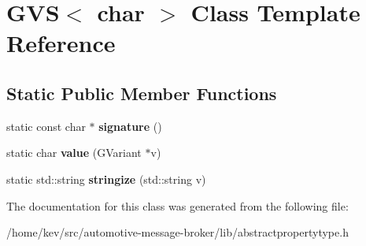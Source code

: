 \hypertarget{classGVS_3_01char_01_4}{\section{G\+V\+S$<$ char $>$ Class Template Reference}
\label{classGVS_3_01char_01_4}
}
\subsection*{Static Public Member Functions}
\begin{DoxyCompactItemize}
\item 
\hypertarget{classGVS_3_01char_01_4_a99899c615057156f961eee40c3ffa054}{static const char $\ast$ {\bfseries signature} ()}\label{classGVS_3_01char_01_4_a99899c615057156f961eee40c3ffa054}

\item 
\hypertarget{classGVS_3_01char_01_4_a1ea37cc4e2f186ed71296a856bde3ea0}{static char {\bfseries value} (G\+Variant $\ast$v)}\label{classGVS_3_01char_01_4_a1ea37cc4e2f186ed71296a856bde3ea0}

\item 
\hypertarget{classGVS_3_01char_01_4_ab3eb5abbfb3a71184aa7741a5bd25dd8}{static std\+::string {\bfseries stringize} (std\+::string v)}\label{classGVS_3_01char_01_4_ab3eb5abbfb3a71184aa7741a5bd25dd8}

\end{DoxyCompactItemize}


The documentation for this class was generated from the following file\+:\begin{DoxyCompactItemize}
\item 
/home/kev/src/automotive-\/message-\/broker/lib/abstractpropertytype.\+h\end{DoxyCompactItemize}
